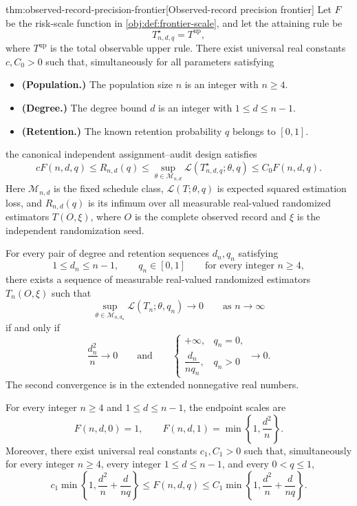 \documentclass[11pt]{article}
\begin{document}
\begin{theoremv}{thm:observed-record-precision-frontier}[Observed-record precision frontier]
Let \(F\) be the risk-scale function in \cref{obj:def:frontier-scale}, and let the attaining rule be
\[
T^\star_{n,d,q}=T^{\mathrm{up}},
\]
where \(T^{\mathrm{up}}\) is the total observable upper rule. There exist universal real constants \(c,C_0>0\) such that, simultaneously for all parameters satisfying
\begin{itemize}
\item \textbf{(Population.)} The population size \(n\) is an integer with \(n\ge4\).
\item \textbf{(Degree.)} The degree bound \(d\) is an integer with \(1\le d\le n-1\).
\item \textbf{(Retention.)} The known retention probability \(q\) belongs to \([0,1]\).
\end{itemize}
the canonical independent assignment--audit design satisfies
\[
cF(n,d,q)
\le R_{n,d}(q)
\le
\sup_{\theta\in\mathcal M_{n,d}}
\mathcal L(T^\star_{n,d,q};\theta,q)
\le C_0F(n,d,q).
\]
Here \(\mathcal M_{n,d}\) is the fixed schedule class, \(\mathcal L(T;\theta,q)\) is expected squared estimation loss, and \(R_{n,d}(q)\) is its infimum over all measurable real-valued randomized estimators \(T(O,\xi)\), where \(O\) is the complete observed record and \(\xi\) is the independent randomization seed.

For every pair of degree and retention sequences \(d_n,q_n\) satisfying
\[
1\le d_n\le n-1,\qquad q_n\in[0,1]
\qquad\text{for every integer }n\ge4,
\]
there exists a sequence of measurable real-valued randomized estimators \(T_n(O,\xi)\) such that
\[
\sup_{\theta\in\mathcal M_{n,d_n}}
\mathcal L(T_n;\theta,q_n)\longrightarrow0
\qquad\text{as }n\longrightarrow\infty
\]
if and only if
\[
\frac{d_n^2}{n}\longrightarrow0
\qquad\text{and}\qquad
\begin{cases}
+\infty,&q_n=0,\\[2pt]
\dfrac{d_n}{nq_n},&q_n>0
\end{cases}
\longrightarrow0.
\]
The second convergence is in the extended nonnegative real numbers.

For every integer \(n\ge4\) and \(1\le d\le n-1\), the endpoint scales are
\[
F(n,d,0)=1,
\qquad
F(n,d,1)=\min\left\{1,\frac{d^2}{n}\right\}.
\]
Moreover, there exist universal real constants \(c_1,C_1>0\) such that, simultaneously for every integer \(n\ge4\), every integer \(1\le d\le n-1\), and every \(0<q\le1\),
\[
c_1\min\left\{1,\frac{d^2}{n}+\frac{d}{nq}\right\}
\le F(n,d,q)
\le
C_1\min\left\{1,\frac{d^2}{n}+\frac{d}{nq}\right\}.
\]
\end{theoremv}
\end{document}
